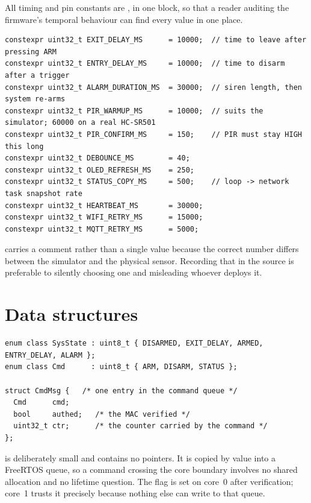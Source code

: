 All timing and pin constants are , in one block, so that a reader auditing the
firmware's temporal behaviour can find every value in one place.

\begin{lstlisting}[style=cpp,caption={Timing constants, \code{smart\_home.ino}}]
constexpr uint32_t EXIT_DELAY_MS      = 10000;  // time to leave after pressing ARM
constexpr uint32_t ENTRY_DELAY_MS     = 10000;  // time to disarm after a trigger
constexpr uint32_t ALARM_DURATION_MS  = 30000;  // siren length, then system re-arms
constexpr uint32_t PIR_WARMUP_MS      = 10000;  // suits the simulator; 60000 on a real HC-SR501
constexpr uint32_t PIR_CONFIRM_MS     = 150;    // PIR must stay HIGH this long
constexpr uint32_t DEBOUNCE_MS        = 40;
constexpr uint32_t OLED_REFRESH_MS    = 250;
constexpr uint32_t STATUS_COPY_MS     = 500;    // loop -> network task snapshot rate
constexpr uint32_t HEARTBEAT_MS       = 30000;
constexpr uint32_t WIFI_RETRY_MS      = 15000;
constexpr uint32_t MQTT_RETRY_MS      = 5000;
\end{lstlisting}

 carries a comment rather than a single value because the correct number
differs between the simulator and the physical sensor. Recording that in the source is
preferable to silently choosing one and misleading whoever deploys it.

\section{Data structures}

\begin{lstlisting}[style=cpp,caption={Core data structures, \code{smart\_home.ino}}]
enum class SysState : uint8_t { DISARMED, EXIT_DELAY, ARMED, ENTRY_DELAY, ALARM };
enum class Cmd      : uint8_t { ARM, DISARM, STATUS };

struct CmdMsg {   /* one entry in the command queue */
  Cmd      cmd;
  bool     authed;   /* the MAC verified */
  uint32_t ctr;      /* the counter carried by the command */
};
\end{lstlisting}

 is deliberately small and contains no pointers. It is copied by value into a
FreeRTOS queue, so a command crossing the core boundary involves no shared allocation and no
lifetime question. The  flag is set on core~0 after verification; core~1 trusts it
precisely because nothing else can write to that queue.


